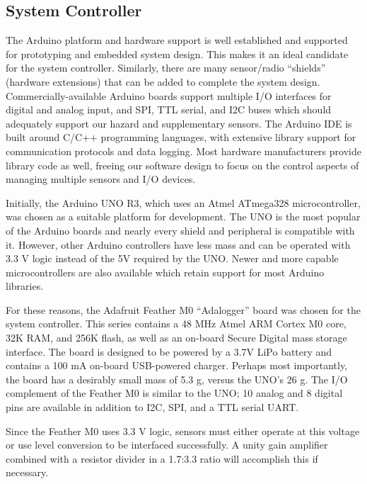 \documentclass[conference,compsoc]{IEEEtran}
\begin{document}
\subsection{System Controller}
The Arduino platform and hardware support is well established and supported for prototyping and embedded system design. This makes it an ideal candidate for the system controller. Similarly, there are many sensor/radio “shields” (hardware extensions) that can be added to complete the system design. Commercially-available Arduino boards support multiple I/O interfaces for digital and analog input, and SPI, TTL serial, and I2C buses which should adequately support our hazard and supplementary sensors. The Arduino IDE is built around C/C++ programming languages, with extensive library support for communication protocols and data logging. Most hardware manufacturers provide library code as well, freeing our software design to focus on the control aspects of managing multiple sensors and I/O devices. 

Initially, the Arduino UNO R3, which uses an Atmel ATmega328 microcontroller, was chosen as a suitable platform for development.  The UNO is the most popular of the Arduino boards and nearly every shield and peripheral is compatible with it.  However, other Arduino controllers have less mass and can be operated with 3.3 V logic instead of the 5V required by the UNO. Newer and more capable microcontrollers are also available which retain support for most Arduino libraries.  

For these reasons, the Adafruit Feather M0 “Adalogger” board was chosen for the system controller.  This series contains a 48 MHz Atmel ARM Cortex M0 core, 32K RAM, and 256K flash, as well as an on-board Secure Digital mass storage interface.  The board is designed to be powered by a 3.7V LiPo battery and contains a 100 mA on-board USB-powered charger.  Perhaps most importantly, the board has a desirably small mass of 5.3 g, versus the UNO’s 26 g.  The I/O complement of the Feather M0 is similar to the UNO; 10 analog and 8 digital pins are available in addition to I2C, SPI, and a TTL serial UART.  

Since the Feather M0 uses 3.3 V logic, sensors must either operate at this voltage or use level conversion to be interfaced successfully.  A unity gain amplifier combined with a resistor divider in a 1.7:3.3 ratio will accomplish this if necessary.
\end{document}
